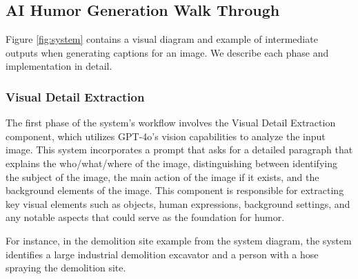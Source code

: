 

\subsection{AI Humor Generation Walk Through}
Figure \ref{fig:system} contains a visual diagram and example of intermediate outputs when generating captions for an image. We describe each phase and implementation in detail.  

\subsubsection{Visual Detail Extraction}

The first phase of the system’s workflow involves the Visual Detail Extraction component, which utilizes GPT-4o’s vision capabilities to analyze the input image. This system incorporates a prompt that asks for a detailed paragraph that explains the who/what/where of the image, distinguishing between identifying the subject of the image, the main action of the image if it exists, and the background elements of the image. This component is responsible for extracting key visual elements such as objects, human expressions, background settings, and any notable aspects that could serve as the foundation for humor.

For instance, in the demolition site example from the system diagram, the system identifies a large industrial demolition excavator and a person with a hose spraying the demolition site. 

